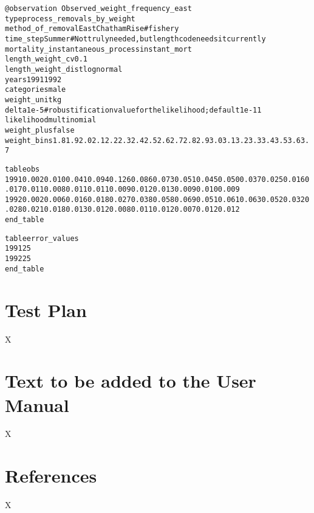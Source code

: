 \documentclass[a4paper,11pt,twoside,pdftex,draft]{article}
\begin{document}
\begin{alltt}
\texttt{@observation Observed\_weight\_frequency\_east}
type process\_removals\_by\_weight
method\_of\_removal EastChathamRise  # fishery
time\_step Summer # Not truly needed, but length code needs it currently
mortality\_instantaneous\_process instant\_mort
length\_weight\_cv 0.1
length\_weight\_dist lognormal
years 1991 1992
categories male
weight\_unit kg
delta 1e-5  # robustification value for the likelihood; default 1e-11
likelihood multinomial
weight\_plus false
weight\_bins 1.8 1.9 2.0 2.1 2.2 2.3 2.4 2.5 2.6 2.7 2.8 2.9 3.0 3.1 3.2 3.3 3.4 3.5 3.6 3.7 % 3.8 3.9 4.0 4.1 4.2 4.3 4.4 4.5 4.6 4.7 4.8 4.9 5.0 5.1 5.2 5.3 5.4 5.5 5.6 5.7 5.8 5.9 6.0 6.1 6.2 6.3 6.4 6.5 6.6 6.7 6.8 6.9 7.0 7.1 7.2 7.3 7.4 7.5 7.6 7.7 7.8 7.9 8.0 8.1 8.2 8.3 8.4 8.5 8.6 8.7 8.8 8.9 9.0 9.1 9.2 9.3 9.4 9.5 9.6 9.7 9.8 9.9 10.0 10.1 10.2 10.3 10.4 10.5 10.6 10.7 10.8 10.9 11.0 11.1 11.2 11.3 11.4 11.5 11.6 11.7 11.8

table obs
1991 0.002 0.010 0.041 0.094 0.126 0.086 0.073 0.051 0.045 0.050 0.037 0.025 0.016 0.017 0.011 0.008 0.011 0.011 0.009 0.012 0.013 0.009 0.010 0.009 % 0.0100.0070.0080.0060.0050.0100.0080.0140.0080.0120.0060.0070.0090.0050.0070.0060.0040.0060.0040.0040.0070.0050.0020.0060.0040.0030.0040.0020.0040.0030.0020.0020.0020.0010.0020.0030.0010.0020.0010.0010.0010.0010.0010.0010.0010.0000.0010.0010.0000.0010.0010.0010.0010.0000.0010.0010.0010.0010.0010.0010.0000.0010.0000.0010.0000.0000.0010.0000.0000.0000.0000.0000.0000.0000.0000.001
1992 0.002 0.006 0.016 0.018 0.027 0.038 0.058 0.069 0.051 0.061 0.063 0.052 0.032 0.028 0.021 0.018 0.013 0.012 0.008 0.011 0.012 0.007 0.012 0.012 % 0.0150.0070.0090.0110.0090.0100.0140.0130.0120.0190.0110.0130.0130.0090.0100.0140.0080.0090.0060.0060.0080.0080.0050.0080.0070.0060.0030.0060.0060.0040.0020.0040.0070.0030.0040.0030.0020.0030.0020.0020.0020.0020.0020.0020.0020.0020.0020.0010.0010.0010.0020.0020.0010.0020.0020.0020.0010.0010.0010.0020.0010.0010.0010.0010.0010.0000.0010.0010.0000.0010.0010.0000.0000.0010.0000.001
end\_table

table error\_values
1991 25
1992 25
end\_table
\end{alltt}

\section{Test Plan}

X

\section{Text to be added to the User Manual}

X

\section{References}

X
\end{document}
